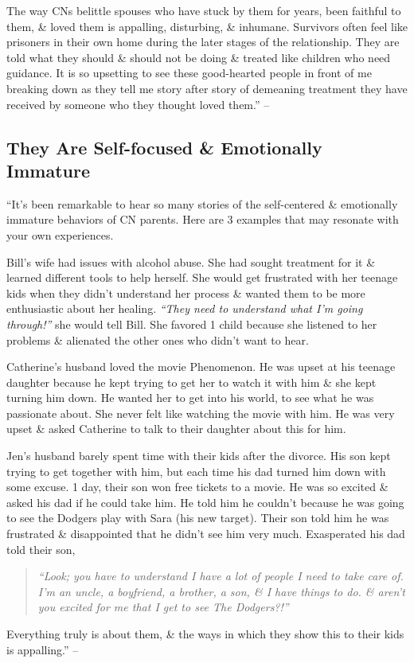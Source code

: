 \documentclass{article}
\numberwithin{equation}{section}
\begin{document}
The way CNs belittle spouses who have stuck by them for years, been faithful to them, \& loved them is appalling, disturbing, \& inhumane. Survivors often feel like prisoners in their own home during the later stages of the relationship. They are told what they should \& should not be doing \& treated like children who need guidance. It is so upsetting to see these good-hearted people in front of me breaking down as they tell me story after story of demeaning treatment they have received by someone who they thought loved them.'' -- \cite[pp. 64--65]{Mirza2017}

\subsection{They Are Self-focused \& Emotionally Immature}
``It's been remarkable to hear so many stories of the self-centered \& emotionally immature behaviors of CN parents. Here are 3 examples that may resonate with your own experiences.

Bill's wife had issues with alcohol abuse. She had sought treatment for it \& learned different tools to help herself. She would get frustrated with her teenage kids when they didn't understand her process \& wanted them to be more enthusiastic about her healing. \textit{``They need to understand what I'm going through!''} she would tell Bill. She favored 1 child because she listened to her problems \& alienated the other ones who didn't want to hear.

Catherine's husband loved the movie Phenomenon. He was upset at his teenage daughter because he kept trying to get her to watch it with him \& she kept turning him down. He wanted her to get into his world, to see what he was passionate about. She never felt like watching the movie with him. He was very upset \& asked Catherine to talk to their daughter about this for him.

Jen's husband barely spent time with their kids after the divorce. His son kept trying to get together with him, but each time his dad turned him down with some excuse. 1 day, their son won free tickets to a movie. He was so excited \& asked his dad if he could take him. He told him he couldn't because he was going to see the Dodgers play with Sara (his new target). Their son told him he was frustrated \& disappointed that he didn't see him very much. Exasperated his dad told their son,
\begin{quotation}\it
	``Look; you have to understand I have a lot of people I need to take care of. I'm an uncle, a boyfriend, a brother, a son, \& I have things to do. \& aren't you excited for me that I get to see The Dodgers?!''
\end{quotation}
Everything truly is about them, \& the ways in which they show this to their kids is appalling.'' -- \cite[pp. 65--66]{Mirza2017}
\end{document}
